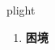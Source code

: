 
\begin{frame}
{\huge plight}
\begin{center}
\begin{enumerate}\Large
  \item \textbf{困境}
\end{enumerate}
\end{center}
\end{frame}
